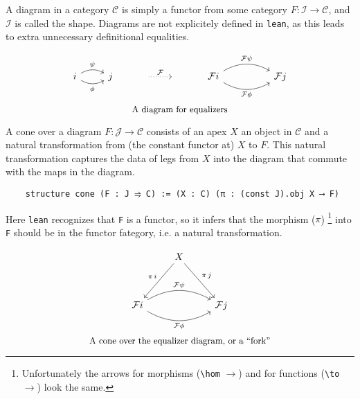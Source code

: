 \documentclass{article}
\newcommand{\CC}{\mathcal{C}}
\newcommand{\II}{\mathcal{I}}
\newcommand{\JJ}{\mathcal{J}}
\newcommand{\<}{\langle}
\renewcommand{\>}{\rangle}
\theoremstyle{definitionstyle}
\theoremstyle{exercisestyle}
\theoremstyle{remarkstyle}
\begin{document}
\begin{dfn}
  A diagram in a category $\CC$ is simply a functor from some category
  $F : \II \to \CC$, and $\II$ is called the shape.
  Diagrams are not explicitely defined in \texttt{lean},
  as this leads to extra unnecessary definitional equalities.

  \[\begin{tikzcd}
  	i & j & {} & {} & {\mathcal{F} i} && {\mathcal{F} j}
  	\arrow["{\mathcal{F} \phi}"', bend right={30}, from=1-5, to=1-7]
  	\arrow["{\mathcal{F} \psi}", bend right={-30}, from=1-5, to=1-7]
  	\arrow["\phi"', bend right={30}, from=1-1, to=1-2]
  	\arrow["\psi", bend right={-30}, from=1-1, to=1-2]
  	\arrow["{\mathcal{F}}", dotted, from=1-3, to=1-4]
  \end{tikzcd}\]
  \[ \text{\small A diagram for equalizers}\]

  A cone over a diagram $F : \JJ \to \CC$ consists of an apex $X$ an object in $\CC$
  and a natural transformation from (the constant functor at) $X$ to $F$.
  This natural transformation captures the data of legs from $X$ into the diagram
  that commute with the maps in the diagram.

  \begin{lstlisting}
    structure cone (F : J ⥤ C) := (X : C) (π : (const J).obj X ⟶ F) \end{lstlisting}

  Here \texttt{lean} recognizes that \texttt{F} is a functor,
  so it infers that the morphism ($\pi$)
  \footnote{Unfortunately the arrows for morphisms (\texttt{\textbackslash hom} $\to$)
    and for functions (\texttt{\textbackslash to} $\to$) look the same.}
  into \texttt{F} should be
  in the functor fategory, i.e. a natural transformation.

    \[\begin{tikzcd}
  	& X \\
  	\\
  	{\mathcal{F} i} && {\mathcal{F} j}
  	\arrow["{\mathcal{F} \phi}"', bend right={30}, from=3-1, to=3-3]
  	\arrow["{\mathcal{F} \psi}", bend right={-30}, from=3-1, to=3-3]
  	\arrow["{\pi \, i}"', from=1-2, to=3-1]
  	\arrow["{\pi \, j}", from=1-2, to=3-3]
  \end{tikzcd}\]
  \[ \text{\small A cone over the equalizer diagram, or a ``fork''}\]


\end{dfn}
\end{document}

